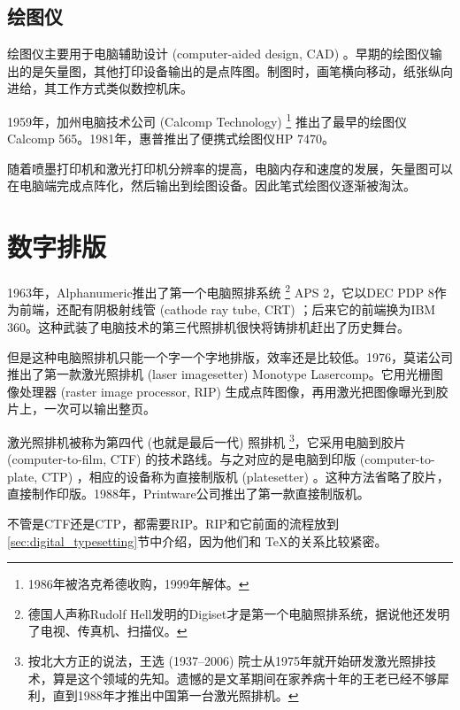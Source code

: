 \subsection{绘图仪}

绘图仪主要用于电脑辅助设计 (computer-aided design, CAD) 。早期的绘图仪输出的是矢量图，其他打印设备输出的是点阵图。制图时，画笔横向移动，纸张纵向进给，其工作方式类似数控机床。

1959年，加州电脑技术公司 (Calcomp Technology)\indexCalcomp{} \footnote{1986年被洛克希德收购，1999年解体。} 推出了最早的绘图仪Calcomp 565。1981年，惠普推出了便携式绘图仪HP 7470。

随着喷墨打印机和激光打印机分辨率的提高，电脑内存和速度的发展，矢量图可以在电脑端完成点阵化，然后输出到绘图设备。因此笔式绘图仪逐渐被淘汰。

\section{数字排版}

1963年，Alphanumeric\indexAlphanumeric{}推出了第一个电脑照排系统 \footnote{德国人声称Rudolf Hell发明的Digiset才是第一个电脑照排系统，据说他还发明了电视、传真机、扫描仪。} APS 2，它以DEC PDP 8作为前端，还配有阴极射线管 (cathode ray tube, CRT) ；后来它的前端换为IBM 360。这种武装了电脑技术的第三代照排机很快将铸排机赶出了历史舞台。

但是这种电脑照排机只能一个字一个字地排版，效率还是比较低。1976，莫诺公司推出了第一款激光照排机 (laser imagesetter) Monotype Lasercomp。它用光栅图像处理器 (raster image processor, RIP) 生成点阵图像，再用激光把图像曝光到胶片上，一次可以输出整页。

激光照排机被称为第四代 (也就是最后一代) 照排机 \footnote{按北大方正的说法，王选 (1937--2006) 院士从1975年就开始研发激光照排技术，算是这个领域的先知。遗憾的是文革期间在家养病十年的王老已经不够犀利，直到1988年才推出中国第一台激光照排机。}，它采用电脑到胶片 (computer-to-film, CTF) 的技术路线。与之对应的是电脑到印版 (computer-to-plate, CTP) ，相应的设备称为直接制版机 (platesetter) 。这种方法省略了胶片，直接制作印版。1988年，Printware公司\indexPrintware{}推出了第一款直接制版机。

不管是CTF还是CTP，都需要RIP。RIP和它前面的流程放到 \ref{sec:digital_typesetting}节中介绍，因为他们和 \TeX 的关系比较紧密。
